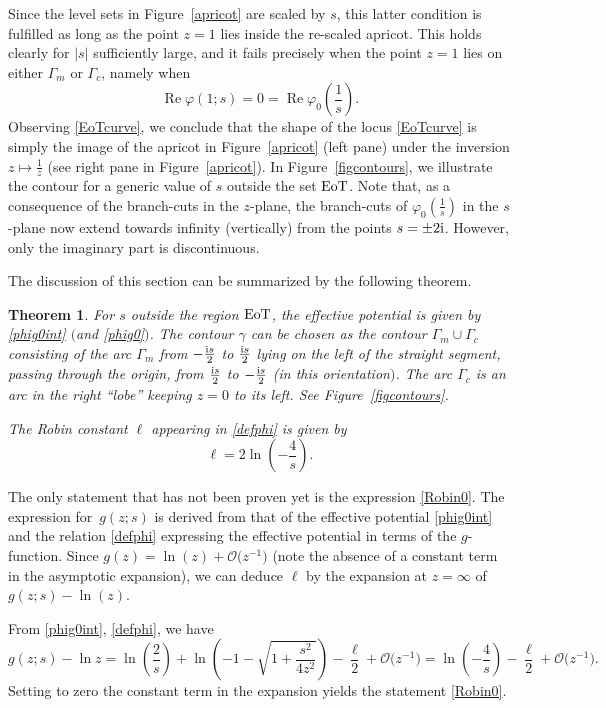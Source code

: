 \documentclass[pdftex]{sigma}
\numberwithin{equation}{section}
\newtheorem{Theorem}{Theorem}[section]
\theoremstyle{definition}
\def\le{\left}
\def\ri{\right}
\def\be{\begin{equation}}
\def\ee{\end{equation}}
\def \Re{\operatorname{Re} }
\begin{document}
 Since the level sets in Figure~\ref{apricot} are scaled by $s$, this latter condition is fulfilled as long as the point $z=1$ lies inside the re-scaled apricot. This holds clearly for $|s|$ sufficiently large, and it fails precisely when the point $z=1$ lies on either $\Gamma_m$ or $\Gamma_c$, namely when
 \be
 \label{EoTcurve}
 \Re \varphi(1;s) = 0 = \Re \varphi_0\le(\frac 1 s\ri).
 \ee
 Observing \eqref{EoTcurve}, we conclude that the shape of the locus \eqref{EoTcurve} is simply the image of the apricot in Figure~\ref{apricot} (left pane) under the inversion $z\mapsto \frac 1 z$ (see right pane in Figure~\ref{apricot}).
In Figure~\ref{figcontours},
 we illustrate the contour for a generic value of $s$ outside the set ${\rm EoT}$.
 Note that, as a consequence of the branch-cuts in the $z$-plane, the branch-cuts of $\varphi_0\le(\frac 1 s\ri)$ in the $s$-plane now extend towards infinity (vertically) from the points $s = \pm 2{\rm i}$. However, only the imaginary part is discontinuous.

The discussion of this section can be summarized by the following theorem.
\begin{Theorem}
For $s$ outside the region ${\rm EoT}$, the effective potential is given by \eqref{phig0int} $($and \eqref{phig0}$)$. The contour $\gamma$ can be chosen as the contour $\Gamma_m\cup \Gamma_c$ consisting of the arc $\Gamma_{m}$ from $-\frac {{\rm i}s} 2$ to $\frac {{\rm i}s} 2$ lying on the left of the straight segment, passing through the origin, from $\frac {{\rm i}s}2$ to $-\frac {{\rm i}s}2$ {\rm(}in this orientation$)$. The arc $\Gamma_{c}$ is an arc in the right ``lobe'' keeping $z=0$ to its left. See Figure~{\rm\ref{figcontours}}.

The Robin constant $\ell$ appearing in \eqref{defphi} is given by
\be
\label{Robin0}
\ell = 2 \ln \le(-\frac 4 s\ri).
\ee
\end{Theorem}
The only statement that has not been proven yet is the expression \eqref{Robin0}. The expression for~$g(z;s)$ is derived from that of the effective potential \eqref{phig0int} and the relation \eqref{defphi} expressing the effective potential in terms of the $g$-function.
Since $g(z) = \ln (z) + \mathcal O\bigl(z^{-1}\bigr)$ (note the absence of a constant term in the asymptotic expansion),
we can deduce $\ell$ by the expansion at $z=\infty$ of~${g(z;s)- \ln(z)}$.

From \eqref{phig0int}, \eqref{defphi}, we have
\[
g(z;s)-\ln z = \ln \le(\frac 2 s\ri) + \ln \le(-1 - \sqrt{1 + \frac{s^2}{4z^2}}\ri) - \frac \ell 2 + \mathcal O\bigl(z^{-1}\bigr) = \ln\le(-\frac 4 s\ri) - \frac \ell 2 + \mathcal O\bigl(z^{-1}\bigr).
\]
Setting to zero the constant term in the expansion yields the statement \eqref{Robin0}.
\end{document}
